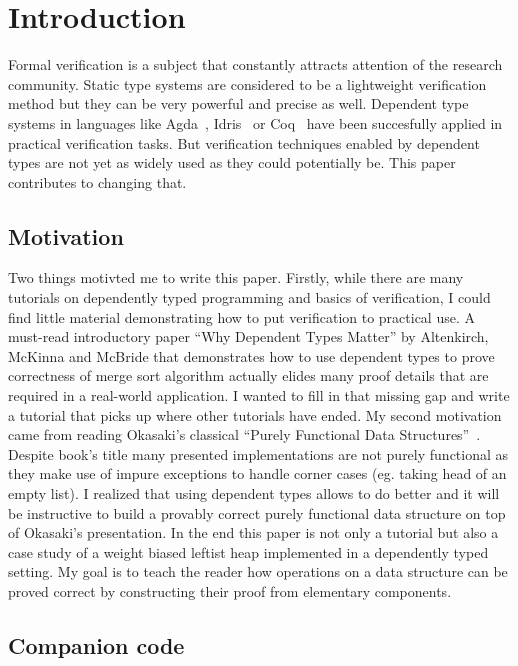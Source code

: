 \section{Introduction}

Formal verification is a subject that constantly attracts attention of the research community. Static type systems are considered to be a lightweight verification method but they can be very powerful and precise as well. Dependent type systems in languages like Agda~\cite{Nor07}, Idris~\cite{Bra13} or Coq~\cite{coq} have been succesfully applied in practical verification tasks. But verification techniques enabled by dependent types are not yet as widely used as they could potentially be. This paper contributes to changing that.

\subsection{Motivation}

Two things motivted me to write this paper. Firstly, while there are many tutorials on dependently typed programming and basics of verification, I could find little material demonstrating how to put verification to practical use. A must-read introductory paper ``Why Dependent Types Matter'' by Altenkirch, McKinna and McBride \cite{AltMcBMcK05} that demonstrates how to use dependent types to prove correctness of merge sort algorithm actually elides many proof details that are required in a real-world application. I wanted to fill in that missing gap and write a tutorial that picks up where other tutorials have ended. My second motivation came from reading Okasaki's classical ``Purely Functional Data Structures''~\cite{Oka99}. Despite book's title many presented implementations are not purely functional as they make use of impure exceptions to handle corner cases (eg. taking head of an empty list). I realized that using dependent types allows to do better and it will be instructive to build a provably correct purely functional data structure on top of Okasaki's presentation. In the end this paper is not only a tutorial but also a case study of a weight biased leftist heap implemented in a dependently typed setting. My goal is to teach the reader how operations on a data structure can be proved correct by constructing their proof from elementary components.

\subsection{Companion code}

